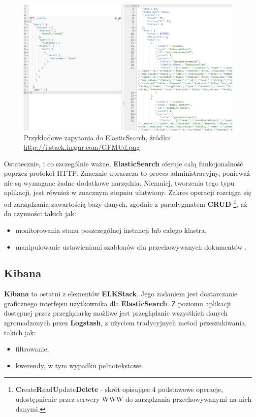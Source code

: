     \begin{figure}[h]
        \centering
        \includegraphics[width=1.0\textwidth]{images/es_query}
        \caption[Przykładowe zapytania do ElasticSearch]{
            Przykładowe zapytania do ElasticSearch, źródło: \url{http://i.stack.imgur.com/GFMUd.png}
        }
        \label{chapter:application:elkstack:es:query}
    \end{figure}
    
    Ostatecznie, i co szczególnie ważne, \textbf{ElasticSearch} oferuje całą funkcjonalność poprzez
    protokół HTTP. Znacznie upraszcza to proces administracyjny, ponieważ nie są wymagane żadne
    dodatkowe narzędzia. Niemniej, tworzenia tego typu aplikacji, jest również w znacznym stopniu ułatwiony.
    Zakres operacji rozciąga się od zarządzania zawartością bazy danych, zgodnie z paradygmatem \textbf{CRUD}
    \footnote{\textbf{C}reate\textbf{R}ead\textbf{U}pdate\textbf{Delete} - skrót opisujące 4 podstawowe
        operacje, udostępnienie przez serwery WWW do zarządzania przechowywanymi na nich danymi.}, 
    aż do czynności takich jak:
    \begin{itemize}
        \item monitorowania stanu poszczególnej instancji lub całego klastra,
        \item manipulowanie ustawieniami szablonów dla przechowywanych dokumentów \cite{elastic_docs}.
    \end{itemize}

\subsection{Kibana}
\label{chapter:application:elkstack:kibana}

    \textbf{Kibana} to ostatni z elementów \textbf{ELKStack}. Jego zadaniem jest dostarczanie graficznego interfejsu
    użytkownika dla \textbf{ElasticSearch}. Z poziomu aplikacji dostępnej przez przeglądarkę możliwe
    jest przeglądanie wszystkich danych zgromadzonych przez \textbf{Logstash}, z użyciem tradycyjnych
    metod przeszukiwania, takich jak:
    \begin{itemize}
        \item filtrowanie,
        \item kwerendy, w tym wypadku pełnotekstowe.
    \end{itemize}
    
